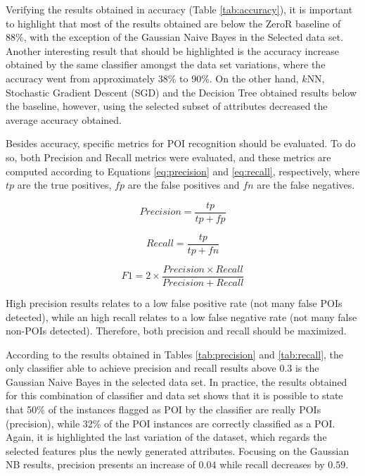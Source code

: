 \documentclass[11pt]{article}
\begin{document}
	
		Verifying the results obtained in accuracy (Table \ref{tab:accuracy}), it is important to highlight that most of the results obtained are below the ZeroR baseline of 88\%, with the exception of the Gaussian Naive Bayes in the Selected data set.
		Another interesting result that should be highlighted is the accuracy increase obtained by the same classifier amongst the data set variations, where the accuracy went from approximately 38\% to 90\%.
		On the other hand, $k$NN, Stochastic Gradient Descent (SGD) and the Decision Tree obtained results below the baseline, however, using the selected subset of attributes decreased the average accuracy obtained.
	
		Besides accuracy, specific metrics for POI recognition should be evaluated.
		To do so, both Precision and Recall metrics were evaluated, and these metrics are computed according to Equations \ref{eq:precision} and \ref{eq:recall}, respectively, where $tp$ are the true positives, $fp$ are the false positives and $fn$ are the false negatives.
		
				
		\begin{equation}
			Precision = \frac{tp}{tp + fp} 
			\label{eq:precision}
		\end{equation} 

		\begin{equation}
			Recall = \frac{tp}{tp + fn}
			\label{eq:recall}
		\end{equation}
		
		\begin{equation}
			F1 = 2 \times \frac{Precision \times Recall}{Precision + Recall}
			\label{eq:f1}
		\end{equation}

		High precision results relates to a low false positive rate (not many false POIs detected), while an high recall relates to a low false negative rate (not many false non-POIs detected).
		Therefore, both precision and recall should be maximized.		
		
		According to the results obtained in Tables \ref{tab:precision} and \ref{tab:recall}, the only classifier able to achieve precision and recall results above 0.3 is the Gaussian Naive Bayes in the selected data set.
		In practice, the results obtained for this combination of classifier and data set shows that it is possible to state that 50\% of the instances flagged as POI by the classifier are really POIs (precision), while 32\% of the POI instances are correctly classified as a POI.
		Again, it is highlighted the last variation of the dataset, which regards the selected features plus the newly generated attributes.
		Focusing on the Gaussian NB results, precision presents an increase of $0.04$ while recall decreases by $0.59$.
\end{document}
